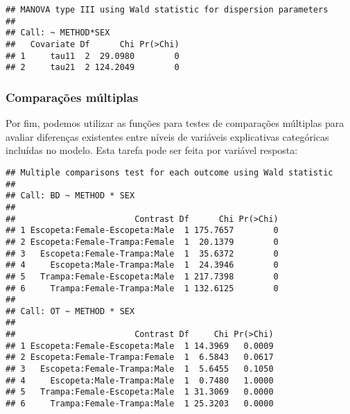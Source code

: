 
\begin{knitrout}
\color{fgcolor}\begin{kframe}
\begin{alltt}
                \hlstd{=} \hlstd{(}\hlstd{,}\hlstd{),}
                \hlstd{=} \hlstd{(}\hlstd{,} \hlstd{))}
\end{alltt}
\begin{verbatim}
## MANOVA type III using Wald statistic for dispersion parameters
## 
## Call: ~ METHOD*SEX
##   Covariate Df      Chi Pr(>Chi)
## 1     tau11  2  29.0980        0
## 2     tau21  2 124.2049        0
\end{verbatim}
\end{kframe}
\end{knitrout}

\subsubsection{Comparações múltiplas}

Por fim, podemos utilizar as funções para testes de comparações múltiplas para avaliar diferenças existentes entre níveis de variáveis explicativas categóricas incluídas no modelo. Esta tarefa pode ser feita por variável resposta:

\begin{knitrout}
\color{fgcolor}\begin{kframe}
\begin{alltt}
\hlstd{(} 
             \hlstd{=} \hlstd{(}\hlstd{(}\hlstd{,} \hlstd{),}
                          \hlstd{(}\hlstd{,} \hlstd{)),}
             
\end{alltt}
\begin{verbatim}
## Multiple comparisons test for each outcome using Wald statistic
## 
## Call: BD ~ METHOD * SEX
## 
##                        Contrast Df      Chi Pr(>Chi)
## 1 Escopeta:Female-Escopeta:Male  1 175.7657        0
## 2 Escopeta:Female-Trampa:Female  1  20.1379        0
## 3   Escopeta:Female-Trampa:Male  1  35.6372        0
## 4     Escopeta:Male-Trampa:Male  1  24.3946        0
## 5   Trampa:Female-Escopeta:Male  1 217.7398        0
## 6     Trampa:Female-Trampa:Male  1 132.6125        0
## 
## Call: OT ~ METHOD * SEX
## 
##                        Contrast Df     Chi Pr(>Chi)
## 1 Escopeta:Female-Escopeta:Male  1 14.3969   0.0009
## 2 Escopeta:Female-Trampa:Female  1  6.5843   0.0617
## 3   Escopeta:Female-Trampa:Male  1  5.6455   0.1050
## 4     Escopeta:Male-Trampa:Male  1  0.7480   1.0000
## 5   Trampa:Female-Escopeta:Male  1 31.3069   0.0000
## 6     Trampa:Female-Trampa:Male  1 25.3203   0.0000
\end{verbatim}
\end{kframe}
\end{knitrout}

